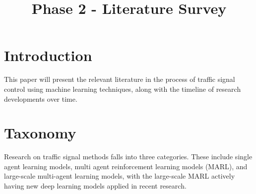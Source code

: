 \documentclass[conference]{IEEEtran}
\begin{document}
\title{Phase 2 - Literature Survey\\}

\author{
\and  
{}  
\and
{}  
\and
{}  
}

\maketitle

\section{Introduction}
This paper will present the relevant literature in the process of traffic signal control using machine learning techniques, along with the timeline of research developments over time.  

\section{Taxonomy}

Research on traffic signal methods falls into three categories. These include single agent learning models, multi agent reinforcement learning models (MARL), and large-scale multi-agent learning models, with the large-scale MARL actively having new deep learning models applied in recent research. 
\end{document}
